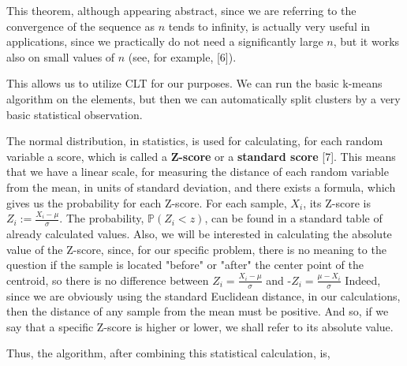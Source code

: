 \documentclass[12pt]{article}
\begin{document}
This theorem, although appearing abstract, since we are referring to the convergence of the sequence 
as $n$ tends to infinity, is actually very useful in applications, since we practically do not need a significantly large $n$, but it works also on small values of $n$ (see, for example, [6]).

This allows us to utilize CLT for our purposes. We can run the basic k-means algorithm on the elements, but then we can automatically split clusters by a very basic statistical observation.

The normal distribution, in statistics, is used for calculating, for each random variable a score, which is called a \textbf{Z-score} or a \textbf{standard score} [7]. This means that we have a linear scale, for measuring the distance of each random variable from the mean, in units of standard deviation, and there exists a formula, which gives us the probability for each Z-score.
For each sample, $X_i$, its Z-score is $Z_i:=\frac{X_i-\mu}{\sigma}$. The probability, $\mathbb{P}(Z_i < z)$, can be found in a standard table of already calculated values. \newline
Also, we will be interested in calculating the absolute value of the Z-score, since, for our specific problem, there is no meaning to the question if the sample is located "before" or "after" the center point of the centroid, so there is no difference between $Z_i=\frac{X_i-\mu}{\sigma}$ and -$Z_i=\frac{\mu-X_i}{\sigma}$ \newline
Indeed, since we are obviously using the standard Euclidean distance, in our calculations, then the distance of any sample from the mean must be positive.
\newline
And so, if we say that a specific Z-score is higher or lower, we shall refer to its absolute value. \newline

Thus, the algorithm, after combining this statistical calculation, is,
\end{document}
